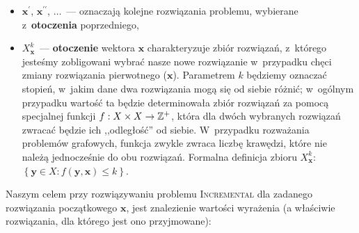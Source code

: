 \begin{itemize}
	\item $\textbf{x}^{\prime}$, $\textbf{x}^{\prime\prime}$, $\dots$~--- oznaczają kolejne rozwiązania problemu, wybierane z~\textbf{otoczenia} poprzedniego,
	\item $X^{k}_{\textbf{x}}$~--- \textbf{otoczenie} wektora $\textbf{x}$ charakteryzuje zbiór rozwiązań, z~którego jesteśmy zobligowani wybrać nasze nowe rozwiązanie w~przypadku chęci zmiany rozwiązania pierwotnego ($\textbf{x}$).
	Parametrem $k$ będziemy oznaczać stopień, w~jakim dane dwa rozwiązania mogą się od siebie różnić; w~ogólnym przypadku wartość ta będzie determinowała zbiór rozwiązań za pomocą specjalnej funkcji $f : X \times X \rightarrow \mathbb{Z}^{+}$, która dla dwóch wybranych rozwiązań zwracać będzie ich ,,odległość'' od siebie.
	W~przypadku rozważania problemów grafowych, funkcja zwykle zwraca liczbę krawędzi, które nie należą jednocześnie do obu rozwiązań. 
	Formalna definicja zbioru $X^{k}_{\textbf{x}}$: $\left\{ \textbf{y} \in X : f \left( \textbf{y}, \textbf{x} \right) \leqslant k \right\}$.
\end{itemize}

Naszym celem przy rozwiązywaniu problemu \textsc{Incremental} dla zadanego rozwiązania początkowego $\textbf{x}$, jest znalezienie wartości wyrażenia (a właściwie rozwiązania, dla którego jest ono przyjmowane):


